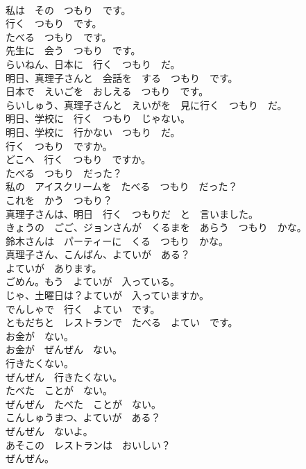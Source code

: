 \documentclass[8pt]{extreport}
\begin{document}
\begin{CJK}{UTF8}{min}
\\	私は　その　つもり　です。	
\\	行く　つもり　です。	
\\	たべる　つもり　です。	
\\	先生に　会う　つもり　です。	
\\	らいねん、日本に　行く　つもり　だ。	
\\	明日、真理子さんと　会話を　する　つもり　です。	
\\	日本で　えいごを　おしえる　つもり　です。	
\\	らいしゅう、真理子さんと　えいがを　見に行く　つもり　だ。	
\\	明日、学校に　行く　つもり　じゃない。	
\\	明日、学校に　行かない　つもり　だ。	
\\	行く　つもり　ですか。	
\\	どこへ　行く　つもり　ですか。	
\\	たべる　つもり　だった？	
\\	私の　アイスクリームを　たべる　つもり　だった？	
\\	これを　かう　つもり？	
\\	真理子さんは、明日　行く　つもりだ　と　言いました。	
\\	きょうの　ごご、ジョンさんが　くるまを　あらう　つもり　かな。	
\\	鈴木さんは　パーティーに　くる　つもり　かな。	
\\	真理子さん、こんばん、よていが　ある？	
\\	よていが　あります。	
\\	ごめん。もう　よていが　入っている。	
\\	じゃ、土曜日は？よていが　入っていますか。	
\\	でんしゃで　行く　よてい　です。	
\\	ともだちと　レストランで　たべる　よてい　です。	
\\	お金が　ない。	
\\	お金が　ぜんぜん　ない。	
\\	行きたくない。	
\\	ぜんぜん　行きたくない。	
\\	たべた　ことが　ない。	
\\	ぜんぜん　たべた　ことが　ない。	
\\	こんしゅうまつ、よていが　ある？	
\\	ぜんぜん　ないよ。	
\\	あそこの　レストランは　おいしい？	
\\	ぜんぜん。	

\end{CJK}
\end{document}
